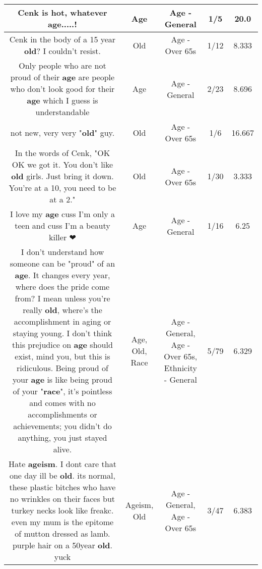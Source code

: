\documentclass[11pt]{article}
\newlength\mylength
\begin{document}
\begin{center}
\begin{longtable}{|C{.65\mylength}|C{.30\mylength}|C{.12\mylength}|C{.12\mylength}|C{.12\mylength}|}
  \small Cenk is hot, whatever \textbf{age}.....!\normalsize   & Age & Age - General & 1/5 & 20.0 \\  \hline
  \small Cenk in the body of a 15 year \textbf{old}? I couldn't resist.\normalsize   & Old & Age - Over 65s & 1/12 & 8.333 \\  \hline
  \small Only people who are not proud of their \textbf{age} are people who don't look good for their \textbf{age} which I guess is understandable\normalsize   & Age & Age - General & 2/23 & 8.696 \\  \hline
  \small not new, very very "\textbf{old}" guy.\normalsize   & Old & Age - Over 65s & 1/6 & 16.667 \\  \hline
  \small In the words of Cenk, "OK OK we got it. You don't like \textbf{old} girls. Just bring it down. You're at a 10, you need to be at a 2."\normalsize   & Old & Age - Over 65s & 1/30 & 3.333 \\  \hline
  \small I love my \textbf{age} cuss I'm only a teen and cuss I'm a beauty killer ❤\normalsize   & Age & Age - General & 1/16 & 6.25 \\  \hline
  \small I don't understand how someone can be "proud" of an \textbf{age}. It changes every year, where does the pride come from? I mean unless you're really \textbf{old}, where's the accomplishment in aging or staying young. I don't think this prejudice on \textbf{age} should exist, mind you, but this is ridiculous. Being proud of your \textbf{age} is like being proud of your "\textbf{race}", it's pointless and comes with no accomplishments or achievements; you didn't do anything, you just stayed alive.\normalsize   & Age, Old, Race & Age - General, Age - Over 65s, Ethnicity - General & 5/79 & 6.329 \\  \hline
  \small Hate \textbf{ageism}. I dont care that one day ill be \textbf{old}. its normal, these plastic bitches who have no wrinkles on their faces but turkey necks look like freakc. even my mum is the epitome of mutton dressed as lamb. purple hair on a 50year \textbf{old}. yuck\normalsize   & Ageism, Old & Age - General, Age - Over 65s & 3/47 & 6.383 \\  \hline
  
\end{longtable}
\end{center}
\end{document}
